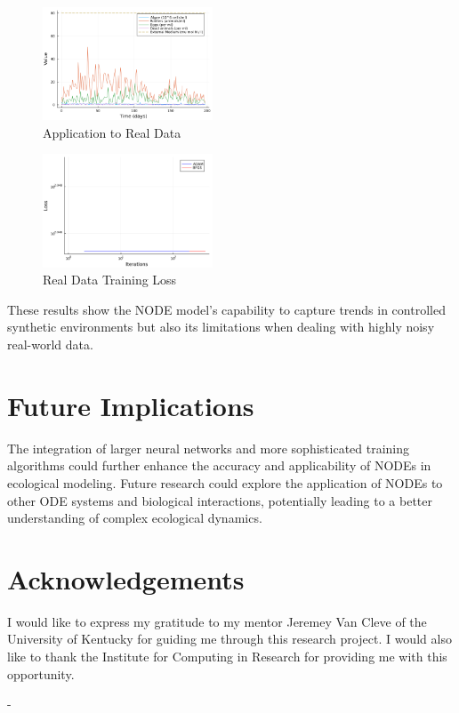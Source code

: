 \documentclass[twocolumn]{article}
\begin{document}
\begin{figure}[h]
    \centering
    \includegraphics[width=0.45\textwidth]{plots/output_plot.png}
    \caption{Application to Real Data}
    \label{fig:real_data_application}
\end{figure}

\begin{figure}[h]
    \centering
    \includegraphics[width=0.45\textwidth]{plots/Chemostat_losses.pdf}
    \caption{Real Data Training Loss}
    \label{fig:real_data_loss}
\end{figure}

\FloatBarrier

These results show the NODE model's capability to capture trends in controlled synthetic environments but also its limitations when dealing with highly noisy real-world data.

\section{Future Implications}
The integration of larger neural networks and more sophisticated training algorithms could further enhance the accuracy and applicability of NODEs in ecological modeling. Future research could explore the application of NODEs to other ODE systems and biological interactions, potentially leading to a better understanding of complex ecological dynamics.

\section{Acknowledgements}
I would like to express my gratitude to my mentor Jeremey Van Cleve of the University of Kentucky for guiding me through this research project. I would also like to thank the Institute for Computing in Research for providing me with this opportunity.

-


\cite{Lotka1925}
\cite{Volterra1926}
\cite{Shertzer2014}
\cite{FIU_Lecture4}
\cite{Dunning1995}
\end{document}
